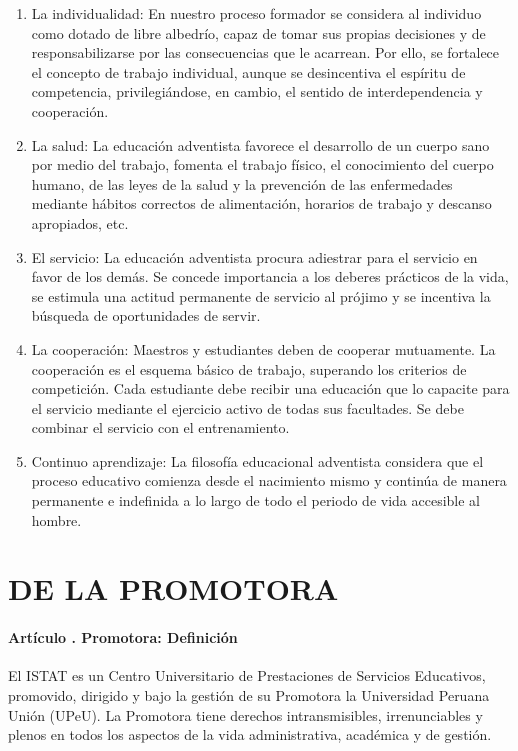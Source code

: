 \begin{enumerate}
\item La individualidad: En nuestro proceso formador se considera al individuo como dotado de libre albedrío, capaz de tomar sus propias decisiones y de responsabilizarse por las consecuencias que le acarrean. Por ello, se fortalece el concepto de trabajo individual, aunque se desincentiva el espíritu de competencia, privilegiándose, en cambio, el sentido de interdependencia y cooperación. 
\item La salud: La educación adventista favorece el desarrollo de un cuerpo sano por medio del trabajo, fomenta el trabajo físico, el conocimiento del cuerpo humano, de las leyes de la salud y la prevención de las enfermedades mediante hábitos correctos de alimentación, horarios de trabajo y descanso apropiados, etc. 
\item El servicio: La educación adventista procura adiestrar para el servicio en favor de los demás. Se concede importancia a los deberes prácticos de la vida, se estimula una actitud permanente de servicio al prójimo y se incentiva la búsqueda de oportunidades de servir. 
\item La cooperación: Maestros y estudiantes deben de cooperar mutuamente. La cooperación es el esquema básico de trabajo, superando los criterios de competición. Cada estudiante debe recibir una educación que lo capacite para el servicio mediante el ejercicio activo de todas sus facultades. Se debe combinar el servicio con el entrenamiento. 
\item Continuo aprendizaje: La filosofía educacional adventista considera que el proceso educativo comienza desde el nacimiento mismo y continúa de manera permanente e indefinida a lo largo de todo el periodo de vida accesible al hombre.
\end{enumerate}
\part{DE LA PROMOTORA}

\subsection{Artículo . Promotora: Definición}
\addtocounter{ns}{1}
El ISTAT es un Centro Universitario de Prestaciones de Servicios Educativos, promovido, dirigido y bajo la gestión de su Promotora la Universidad Peruana Unión (UPeU). La Promotora tiene derechos intransmisibles, irrenunciables y plenos en todos los aspectos de la vida administrativa, académica y de gestión. 
